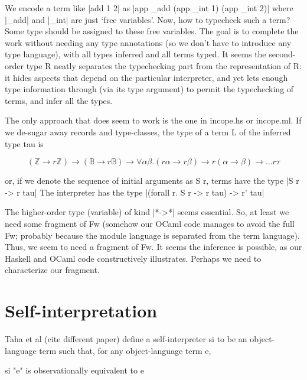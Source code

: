 \documentclass[preprint]{sigplanconf}
\newcommand{\ZZ}{\mathbb{Z}}
\newcommand{\BB}{\mathbb{B}}
\begin{document}
We encode a term like |add 1 2| as
|app _add (app _int 1) (app _int 2)| where |_add| and |_int| are just
`free variables'. Now, how to typecheck such a term? Some type should
be assigned to these free variables. The goal is to complete the work
without needing any type annotations (so we don't have to introduce any
type language), with all types inferred and all terms typed. It seems
the second-order type R neatly separates the typechecking part from
the representation of R: it hides aspects that depend on the
particular interpreter, and yet lets enough type information through
(via its type argument) to permit the typechecking of terms, and infer
all the types. 



The only approach that does seem to work
is the one in incope.hs or incope.ml. If we de-sugar away records and
type-classes, the type of a term L of the inferred type tau is

$$ 
  (\ZZ \rightarrow r \ZZ) \rightarrow
  (\BB \rightarrow r \BB) \rightarrow
  \forall \alpha \beta. (r \alpha \rightarrow r \beta)
      \rightarrow r (\alpha\rightarrow\beta) \rightarrow ... r \tau
$$

or, if we denote the sequence of initial arguments as S r, terms have
the type |S r -> r tau|
The interpreter has the type
|(forall r. S r -> r tau) -> r' tau|

The higher-order type (variable) of kind |*->*| seems essential. So, at
least we need some fragment of Fw (somehow our OCaml code manages to
avoid the full Fw; probably because the module language is separated
from the term language). Thus, we seem to need a fragment of Fw. It
seems the inference is possible, as our Haskell and OCaml code
constructively illustrates. Perhaps we need to characterize our
fragment.


\section{Self-interpretation}\cite{selfinterp}

Taha et al (cite different paper) define a self-interpreter si to be an
object-language term such that, for any object-language term e,

\begin{code}
  si "e"    is observationally equivalent to    e
\end{code}
\end{document}
